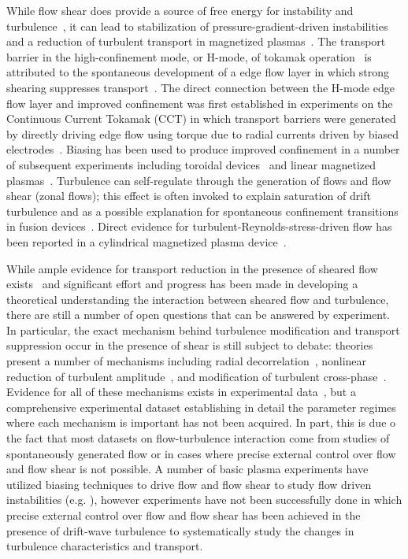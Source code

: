 \documentclass[aps,prl,amsmath,amssymb,preprint,superscriptaddress]{revtex4}
\begin{document}

While flow shear does provide a source of free energy for instability and turbulence~\cite{}, it can lead to stabilization of pressure-gradient-driven instabilities and a reduction of turbulent transport in magnetized plasmas~\cite{Burrell:1997, Terry:2000}.  The transport barrier in the high-confinement mode, or H-mode, of tokamak operation~\cite{wagner82} is attributed to the spontaneous development of a edge flow layer in which  strong shearing suppresses transport~\cite{burrell, terry, hahm?}.  The direct connection between the H-mode edge flow layer and improved confinement was first established in experiments on the Continuous Current Tokamak (CCT) in which transport barriers were generated by directly driving edge flow using torque due to radial currents driven by biased electrodes~\cite{taylor89,tynan92}.  Biasing has been used to produce improved confinement in a number of subsequent experiments including toroidal devices~\cite{Weynants:1992,Boedo:2000,Silva:2006,Craig:1997,Chapman:1998,Shats:2000} and linear magnetized plasmas~\cite{Sakai:1993,maggs07,carter09}.  
Turbulence can self-regulate through the generation of flows and flow
shear (zonal flows); this effect is often invoked to explain
saturation of drift turbulence and as a possible explanation for
spontaneous confinement transitions in fusion
devices~\cite{Terry:2000,Diamond:2005}.  Direct evidence for
turbulent-Reynolds-stress-driven flow has been reported in a
cylindrical magnetized plasma device~\cite{Holland:2006}. 


While ample evidence for transport reduction in the presence of
sheared flow exists~\cite{Burrell:1999, Tynan:2009} and significant
effort and progress has been made in developing a theoretical
understanding the interaction between sheared flow and turbulence,
there are still a number of open questions that can be answered by
experiment.  In particular, the exact mechanism behind turbulence
modification and transport suppression occur in the presence of shear
is still subject to debate: theories present a number of mechanisms
including radial decorrelation~\cite{Biglari:1990}, nonlinear reduction of
turbulent amplitude~\cite{Kim:2004}, and modification of turbulent
cross-phase~\cite{Ware:1996}.  Evidence for all of these mechanisms exists in
experimental data~\cite{Tynan:2009}, but a comprehensive experimental
dataset establishing in detail the parameter regimes where each
mechanism is important has not been acquired.  In part, this is due o
the fact that most datasets on flow-turbulence interaction come from
studies of spontaneously generated flow or in cases where precise
external control over flow and flow shear is not possible.  A number
of basic plasma experiments have utilized biasing techniques to drive
flow and flow shear to study flow driven
instabilities (e.g. \cite{Amatucci:1996,Jassby:1970}),
however experiments have not been successfully done in which precise external
control over flow and flow shear has been achieved in the presence of
drift-wave turbulence to systematically study the changes in
turbulence characteristics and transport.
\end{document}
